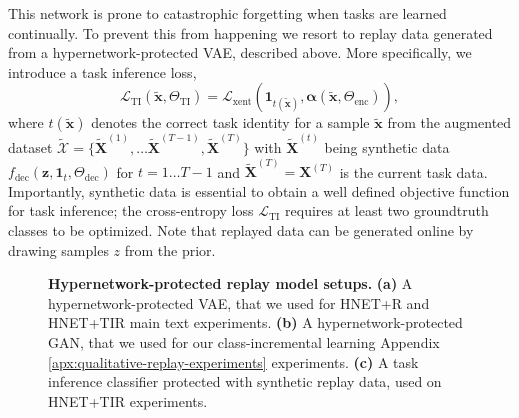 \documentclass{article}
\begin{document}
This network is prone to catastrophic forgetting when tasks are learned continually. To prevent this from happening we resort to replay data generated from a hypernetwork-protected VAE, described above. More specifically, we introduce a task inference loss,
\begin{equation}
  \mathcal{L}_\text{TI} (\tilde{\mathbf{x}}, \Theta_\text{TI}) = \mathcal{L}_\text{xent}(\boldsymbol 1_{t(\tilde{\mathbf{x}})}, \boldsymbol\alpha(\tilde{\mathbf{x}}, \Theta_\text{enc})),
\end{equation}
where $t(\tilde{\mathbf{x}})$ denotes the correct task identity for a sample $\tilde{\mathbf{x}}$ from the augmented dataset $\tilde{\mathcal{X}} = \{ \tilde{\mathbf{X}}^{(1)}, \dots \tilde{\mathbf{X}}^{(T-1)}, \tilde{\mathbf{X}}^{(T)} \}$ with $\tilde{\mathbf{X}}^{(t)}$ being synthetic data $f_\text{dec}(\mathbf{z}, \mathbf{1}_t, \Theta_\text{dec})$ for $t=1 \dots T\!-\!1$ and $\tilde{\mathbf{X}}^{(T)} = \mathbf{X}^{(T)}$ is the current task data. Importantly, synthetic data is essential to obtain a well defined objective function for task inference; the cross-entropy loss $\mathcal{L}_\text{TI}$ requires at least two groundtruth classes to be optimized. Note that replayed data can be generated online by drawing samples $z$ from the prior.

\begin{figure}[htbp]
  \caption{\textbf{Hypernetwork-protected replay model setups.} \textbf{(a)} A hypernetwork-protected VAE, that we used for HNET+R and HNET+TIR main text experiments. \textbf{(b)} A hypernetwork-protected GAN, that we used for our class-incremental learning Appendix \ref{apx:qualitative-replay-experiments} experiments. \textbf{(c)} A task inference classifier protected with synthetic replay data, used on HNET+TIR experiments. \label{fig:replay-setups}} 
\end{figure}
\end{document}
